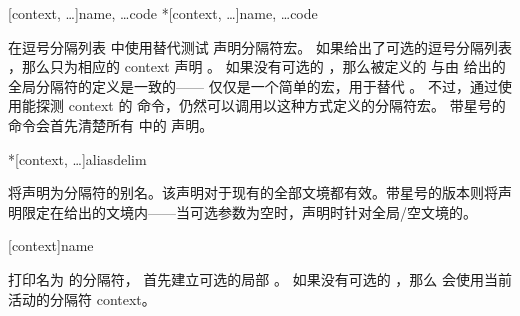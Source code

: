 \begin{ltxsyntax}
[context, \dots]{name, \dots}{code}
*[context, \dots]{name, \dots}{code}


在逗号分隔列表  中使用替代测试  声明分隔符宏。
如果给出了可选的逗号分隔列表 ，那么只为相应的 context 声明 。
如果没有可选的 ，那么被定义的  与由  给出的全局分隔符的定义是一致的——
仅仅是一个简单的宏，用于替代 。
不过，通过使用能探测 context 的  命令，仍然可以调用以这种方式定义的分隔符宏。
带星号的命令会首先清楚所有  中的  声明。

*[context, \dots]{alias}{delim}


将声明为分隔符的别名。该声明对于现有的全部文境都有效。带星号的版本则将声明限定在给出的文境内——当可选参数为空时，声明时针对全局/空文境的。


[context]{name}


打印名为  的分隔符，
首先建立可选的局部 。
如果没有可选的 ，那么  会使用当前活动的分隔符 context。



\end{ltxsyntax}
